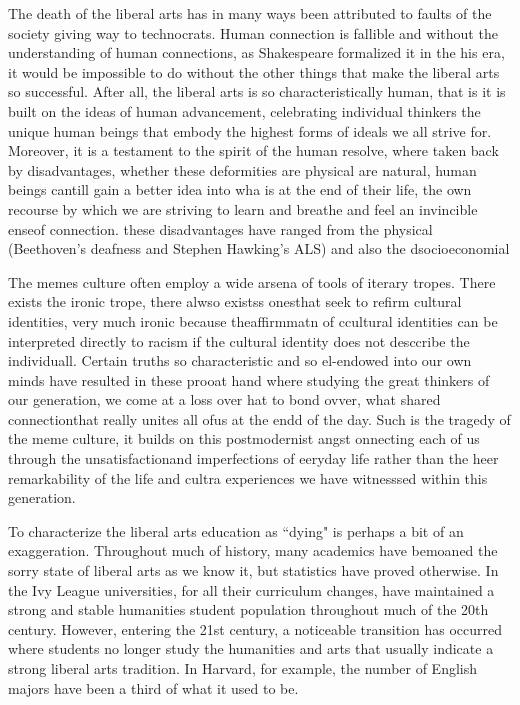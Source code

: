 \documentclass[12pt,letterpaper]{article}
\begin{document}
The death of the liberal arts has in many ways been attributed to faults of the society giving way to technocrats.  Human connection is fallible and without the understanding of human connections, as Shakespeare formalized it in the his era, it would be impossible to do without the other things that make the liberal arts so successful.  After all, the liberal arts is so characteristically human, that is it is built on the ideas of human advancement, celebrating individual thinkers the unique human beings that embody the highest forms of ideals we all strive for.  Moreover, it is a testament to the spirit of the human resolve, where taken back by disadvantages, whether these deformities are physical are natural, human beings cantill gain a better idea into wha is at the end of their life, the own recourse by which we are striving to learn and breathe and feel an invincible enseof connection.  these disadvantages have ranged from the physical (Beethoven's deafness and Stephen Hawking's ALS) and also the dsocioeconomial 

The memes culture often employ a wide arsena of tools of iterary tropes.  There exists the ironic trope, there alwso existss onesthat seek to refirm cultural identities, very much ironic because theaffirmmatn of ccultural identities can be interpreted directly to racism if the cultural identity does  not desccribe the individuall.  Certain truths so characteristic and so el-endowed into our own minds have resulted in these prooat hand where studying the great thinkers of our generation, we come at a loss over hat to bond ovver, what shared connectionthat really unites all ofus at the endd of the day.  Such is the tragedy of the meme culture, it builds on this postmodernist angst onnecting each of us through the unsatisfactionand imperfections of eeryday life  rather than  the heer remarkability  of the life and cultra experiences we have witnesssed within  this generation.  

To characterize the liberal arts education as ``dying" is perhaps a bit of an exaggeration.  Throughout much of history, many academics have bemoaned the sorry state of liberal arts as we know it, but statistics have proved otherwise.  In the Ivy League universities, for all their curriculum changes, have maintained a strong and stable humanities student population throughout much of the 20th century.  However, entering the 21st century, a noticeable transition has occurred where students no longer study the humanities and arts that usually indicate a strong liberal arts tradition.  In Harvard, for example, the number of English majors have been a third of what it used to be.   
\end{document}
